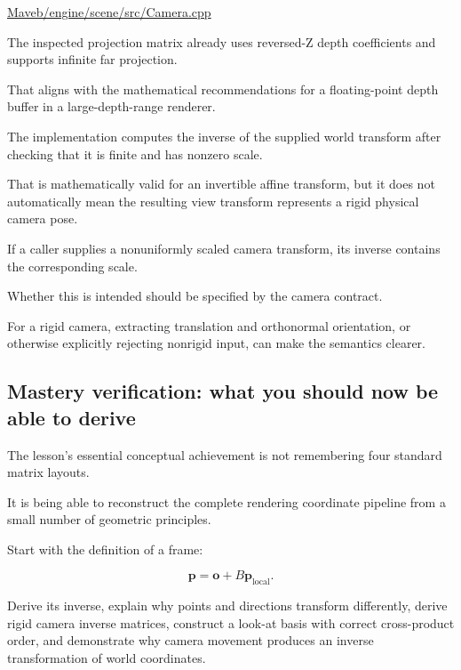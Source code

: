 \hypertarget{02-foundations-ii-ch037-maveb-reversed-z-metal-camera}{}

\href{https://github.com/swayam8624/Maveb/blob/main/engine/scene/src/Camera.cpp?utm_source=chatgpt.com}{Maveb/engine/scene/src/Camera.cpp}

The inspected projection matrix already uses reversed-Z depth coefficients and supports infinite far projection.

That aligns with the mathematical recommendations for a floating-point depth buffer in a large-depth-range renderer.

The  implementation computes the inverse of the supplied world transform after checking that it is finite and has nonzero scale.

That is mathematically valid for an invertible affine transform, but it does not automatically mean the resulting view transform represents a rigid physical camera pose.

If a caller supplies a nonuniformly scaled camera transform, its inverse contains the corresponding scale.

Whether this is intended should be specified by the camera contract.

For a rigid camera, extracting translation and orthonormal orientation, or otherwise explicitly rejecting nonrigid input, can make the semantics clearer.

\subsection{Mastery verification: what you should now be able to derive}\label{02-foundations-ii-ch037-mastery-verification-what-you-should-now-be-able-to-derive}

\hypertarget{02-foundations-ii-ch037-mastery-verification-what-you-should-now-be-able-to-derive}{}

The lesson's essential conceptual achievement is not remembering four standard matrix layouts.

It is being able to reconstruct the complete rendering coordinate pipeline from a small number of geometric principles.

Start with the definition of a frame:

\[
 \mathbf p=\mathbf o+B\mathbf p_{\mathrm{local}}.
\]

Derive its inverse, explain why points and directions transform differently, derive rigid camera inverse matrices, construct a look-at basis with correct cross-product order, and demonstrate why camera movement produces an inverse transformation of world coordinates.

